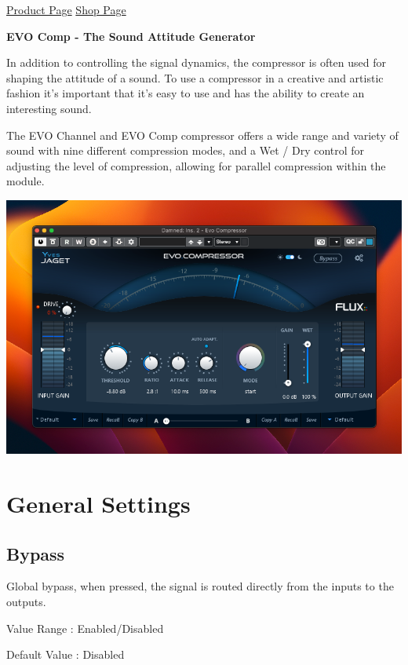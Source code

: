 \documentclass[
  letterpaper,
  DIV=11,
  numbers=noendperiod]{scrreport}
\begin{document}
\href{https://www.flux.audio/project/evo-series/}{Product Page}
\textbar{}
\href{https://shop.flux.audio/en_US/products/evo-series-pack}{Shop Page}

\textbf{EVO Comp - The Sound Attitude Generator}

In addition to controlling the signal dynamics, the compressor is often
used for shaping the attitude of a sound. To use a compressor in a
creative and artistic fashion it's important that it's easy to use and
has the ability to create an interesting sound.

The EVO Channel and EVO Comp compressor offers a wide range and variety
of sound with nine different compression modes, and a Wet / Dry control
for adjusting the level of compression, allowing for parallel
compression within the module.

\includegraphics{include/evoComp.png}


\hypertarget{general-settings}{%
\chapter{General Settings}\label{general-settings}}

\hypertarget{bypass}{%
\section{Bypass}\label{bypass}}

Global bypass, when pressed, the signal is routed directly from the
inputs to the outputs.

Value Range : Enabled/Disabled

Default Value : Disabled
\end{document}
